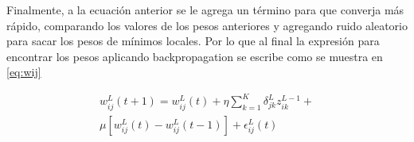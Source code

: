 \documentclass[a4paper,12pt,twocolumn]{article}
\begin{document}
  Finalmente, a la ecuación anterior se le agrega un término para que converja
  más rápido, comparando los valores de los pesos anteriores y agregando ruido
  aleatorio para sacar los pesos de mínimos locales. Por lo que al final la
  expresión para encontrar los pesos aplicando backpropagation se escribe como
  se muestra en \ref{eq:wij}

  \begin{equation}
  \boxed{
  \begin{split}
    w_{ij}^{L}(t+1) = w_{ij}^{L}(t) + \eta
    \sum_{k=1}^{K}\delta_{jk}^{L}z_{ik}^{L-1} + \\
    \mu[w_{ij}^{L}(t) - w_{ij}^{L}(t-1)] + \epsilon_{ij}^{L}(t)
  \end{split}\label{eq:wij}
  }
  \end{equation}







  \nocite{*} %

  

\end{document}
